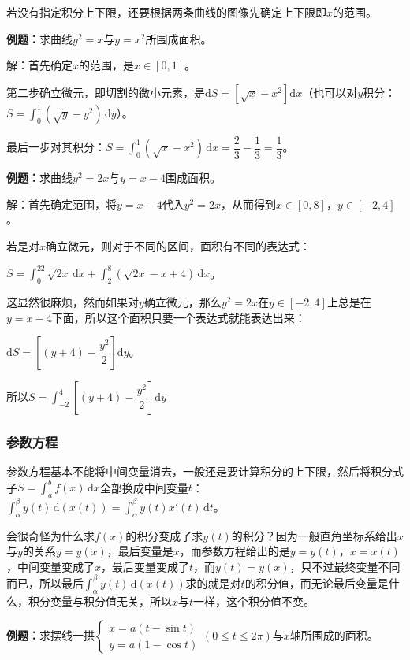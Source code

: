 \documentclass[UTF8, 12pt]{ctexart}
\begin{document}
若没有指定积分上下限，还要根据两条曲线的图像先确定上下限即$x$的范围。

\textbf{例题：}求曲线$y^2=x$与$y=x^2$所围成面积。

解：首先确定$x$的范围，是$x\in[0,1]$。

第二步确立微元，即切割的微小元素，是$\textrm{d}S=[\sqrt{x}-x^2]\textrm{d}x$（也可以对$y$积分：$S=\int_0^1(\sqrt{y}-y^2)\,\textrm{d}y$）。

最后一步对其积分：$S=\int_0^1(\sqrt{x}-x^2)\,\textrm{d}x=\dfrac{2}{3}-\dfrac{1}{3}=\dfrac{1}{3}$。

\textbf{例题：}求曲线$y^2=2x$与$y=x-4$围成面积。

解：首先确定范围，将$y=x-4$代入$y^2=2x$，从而得到$x\in[0,8]$，$y\in[-2,4]$。

若是对$x$确立微元，则对于不同的区间，面积有不同的表达式：

$S=\int_0^22\sqrt{2x}\,\textrm{d}x+\int_2^8(\sqrt{2x}-x+4)\,\textrm{d}x$。

这显然很麻烦，然而如果对$y$确立微元，那么$y^2=2x$在$y\in[-2,4]$上总是在$y=x-4$下面，所以这个面积只要一个表达式就能表达出来：

$\textrm{d}S=\left[(y+4)-\dfrac{y^2}{2}\right]\textrm{d}y$。

所以$S=\displaystyle{\int_{-2}^4\left[(y+4)-\dfrac{y^2}{2}\right]\textrm{d}y}$

\subsubsection{参数方程}

参数方程基本不能将中间变量消去，一般还是要计算积分的上下限，然后将积分式子$S=\int_a^bf(x)\,\textrm{d}x$全部换成中间变量$t$：$\int_\alpha^\beta y(t)\,\textrm{d}(x(t))=\int_\alpha^\beta y(t)x'(t)\,\textrm{d}t$。

会很奇怪为什么求$f(x)$的积分变成了求$y(t)$的积分？因为一般直角坐标系给出$x$与$y$的关系$y=y(x)$，最后变量是$x$，而参数方程给出的是$y=y(t)$，$x=x(t)$，中间变量变成了$x$，最后变量变成了$t$，而$y(t)=y(x)$，只不过最终变量不同而已，所以最后$\int_\alpha^\beta y(t)\,\textrm{d}(x(t))$求的就是对$t$的积分值，而无论最后变量是什么，积分变量与积分值无关，所以$x$与$t$一样，这个积分值不变。

\textbf{例题：}求摆线一拱$\left\{\begin{array}{l}
    x=a(t-\sin t) \\
    y=a(1-\cos t)
\end{array}
\right.$$(0\leqslant t\leqslant 2\pi)$与$x$轴所围成的面积。\medskip
\end{document}
